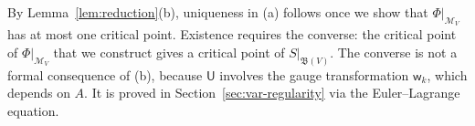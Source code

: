 By Lemma~\ref{lem:reduction}(b), uniqueness in (a) follows once we show that $\Phi|_{\mathcal M_V}$ has at most one critical point. Existence requires the converse: the critical point of $\Phi|_{\mathcal M_V}$ that we construct gives a critical point of $S|_{\mathfrak B(V)}$. The converse is not a formal consequence of (b), because $\mathsf U$ involves the gauge transformation $\mathsf w_k$, which depends on $A$. It is proved in Section~\ref{sec:var-regularity} via the Euler--Lagrange equation.
